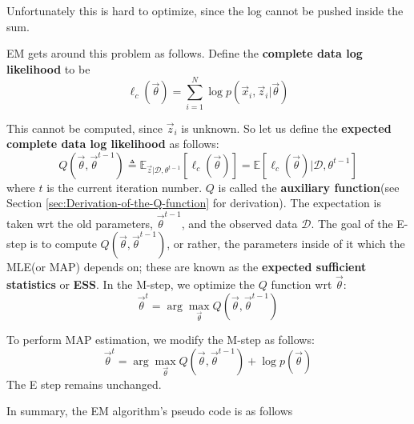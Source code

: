 Unfortunately this is hard to optimize, since the log cannot be pushed inside the sum.

EM gets around this problem as follows. Define the \textbf{complete data log likelihood} to be
\begin{equation}
\ell_c(\vec{\theta})=\sum\limits_{i=1}^N \log p(\vec{x}_i,\vec{z}_i|\vec{\theta})
\end{equation}

This cannot be computed, since $\vec{z}_i$ is unknown. So let us define the \textbf{expected complete data log likelihood} as follows:
\begin{equation}\label{eqn:auxiliary-function}
Q(\vec{\theta},\vec{\theta}^{t-1}) \triangleq \mathbb{E}_{\vec{z}|\mathcal{D},\theta^{t-1}}\left[\ell_c(\vec{\theta})\right]=\mathbb{E}\left[\ell_c(\vec{\theta})| \mathcal{D},\theta^{t-1}\right]
\end{equation}
where $t$ is the current iteration number. $Q$ is called the \textbf{auxiliary function}(see Section \ref{sec:Derivation-of-the-Q-function} for derivation). The expectation is taken wrt the old parameters, $\vec{\theta}^{t-1}$, and the observed data $\mathcal{D}$. The goal of the E-step is to compute $Q(\vec{\theta},\vec{\theta}^{t-1})$, or rather, the parameters inside of it which the MLE(or MAP) depends on; these are known as the \textbf{expected sufficient statistics} or \textbf{ESS}. In the M-step, we optimize the $Q$ function wrt $\vec{\theta}$:
\begin{equation}
\vec{\theta}^t=\arg\max_{\vec{\theta}} Q(\vec{\theta},\vec{\theta}^{t-1})
\end{equation}

To perform MAP estimation, we modify the M-step as follows:
\begin{equation}
\vec{\theta}^t=\arg\max_{\vec{\theta}} Q(\vec{\theta},\vec{\theta}^{t-1})+\log p(\vec{\theta})
\end{equation}
The E step remains unchanged.

In summary, the EM algorithm's pseudo code is as follows

